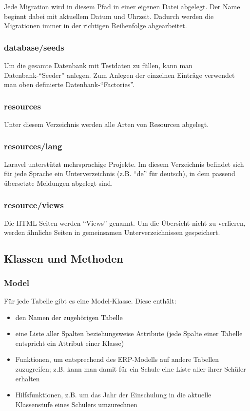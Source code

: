 Jede Migration wird in diesem Pfad in einer eigenen Datei abgelegt. Der Name beginnt dabei mit aktuellem Datum und Uhrzeit. Dadurch werden die Migrationen immer in der richtigen Reihenfolge abgearbeitet.

\subsubsection{database/seeds}

Um die gesamte Datenbank mit Testdaten zu füllen, kann man Datenbank-"`Seeder"' anlegen. Zum Anlegen der einzelnen Einträge verwendet man oben definierte Datenbank-"`Factories"'.

\subsubsection{resources}

Unter diesem Verzeichnis werden alle Arten von Resourcen abgelegt.

\subsubsection{resources/lang}

Laravel unterstützt mehrsprachige Projekte. Im diesem Verzeichnis befindet sich für jede Sprache ein Unterverzeichnis (z.B. "`de"' für deutsch), in dem passend übersetzte Meldungen abgelegt sind.

\subsubsection{resource/views}

Die HTML-Seiten werden "`Views"' genannt. Um die Übersicht nicht zu verlieren, werden ähnliche Seiten in gemeinsamen Unterverzeichnissen gespeichert. 

\subsection{Klassen und Methoden}

\subsubsection{Model}

Für jede Tabelle gibt es eine Model-Klasse. Diese enthält:

  \begin{itemize}
  	\item den Namen der zugehörigen Tabelle
  	\item eine Liste aller Spalten beziehungsweise Attribute (jede Spalte einer Tabelle entspricht ein Attribut einer Klasse)
  	\item Funktionen, um entsprechend des ERP-Modells auf andere Tabellen zuzugreifen; z.B. kann man damit für ein Schule eine Liste aller ihrer Schüler erhalten
  	\item Hilfsfunktionen, z.B. um das Jahr der Einschulung in die aktuelle Klassenstufe eines Schülers umzurechnen
  \end{itemize}


